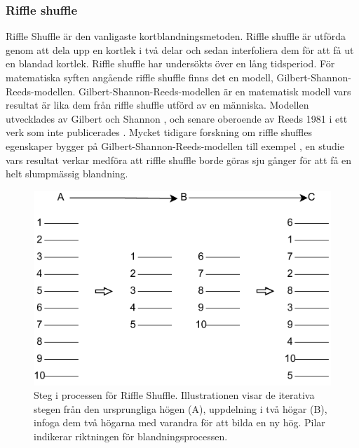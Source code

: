 \documentclass[swedish,a4paper]{article}
\begin{document}
\subsubsection{Riffle shuffle}
\label{sec:riffle_shuffle}
Riffle Shuffle är den vanligaste kortblandningsmetoden. Riffle shuffle är utförda genom att dela upp en kortlek i två delar och sedan interfoliera dem för att få ut en blandad kortlek.
Riffle shuffle har undersökts över en lång tidsperiod. För matematiska syften angående riffle shuffle finns det en modell, Gilbert-Shannon-Reeds-modellen.  Gilbert-Shannon-Reeds-modellen är en matematisk modell vars resultat är lika dem från riffle shuffle utförd av en människa. Modellen utvecklades av Gilbert och Shannon \parencite{gilbertshuftheo}, och senare oberoende av Reeds 1981 i ett verk som inte publicerades \parencite[77-79]{gsr2003mathematical}.  Mycket tidigare forskning om riffle shuffles egenskaper bygger på Gilbert-Shannon-Reeds-modellen till exempel \textcite{dovetaillair}, en studie vars resultat verkar medföra att riffle shuffle borde göras sju gånger för att få en helt slumpmässig blandning. 

\begin{figure}[H]
	\begin{center}
		\includegraphics{images/rifflle-shuffle.pdf}
	\end{center}
	\captionsetup{justification=centering,margin=2cm}
	\caption{Steg i processen för Riffle Shuffle. Illustrationen visar de
	iterativa stegen från den ursprungliga högen (A), uppdelning i två
	högar (B), infoga dem två högarna med varandra för att bilda en ny hög.
        Pilar indikerar riktningen för blandningsprocessen.}
	\label{fig:riffle_shuffle_1}
\end{figure}
\end{document}
